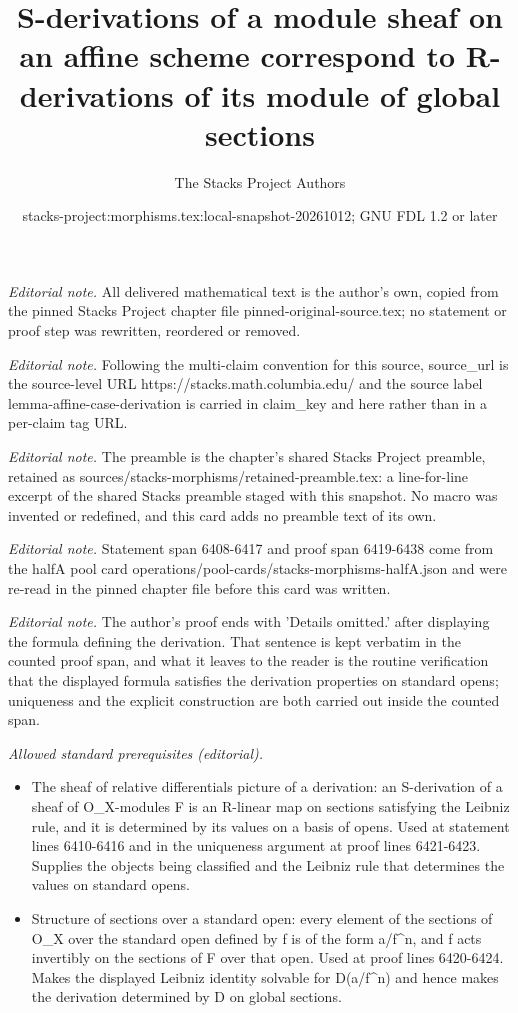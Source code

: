 \documentclass[10pt,a4paper]{amsart}
\title{S-derivations of a module sheaf on an affine scheme correspond to R-derivations of its module of global sections}
\author{The Stacks Project Authors}
\date{stacks-project:morphisms.tex:local-snapshot-20261012; GNU FDL 1.2 or later}
\theoremstyle{plain}
\theoremstyle{definition}
\theoremstyle{remark}
\numberwithin{equation}{subsection}
\begin{document}
\maketitle
\noindent\textit{Editorial note.} All delivered mathematical text is the author's own, copied from the pinned Stacks Project chapter file pinned-original-source.tex; no statement or proof step was rewritten, reordered or removed.\par\medskip
\noindent\textit{Editorial note.} Following the multi-claim convention for this source, source\_url is the source-level URL https://stacks.math.columbia.edu/ and the source label lemma-affine-case-derivation is carried in claim\_key and here rather than in a per-claim tag URL.\par\medskip
\noindent\textit{Editorial note.} The preamble is the chapter's shared Stacks Project preamble, retained as sources/stacks-morphisms/retained-preamble.tex: a line-for-line excerpt of the shared Stacks preamble staged with this snapshot. No macro was invented or redefined, and this card adds no preamble text of its own.\par\medskip
\noindent\textit{Editorial note.} Statement span 6408-6417 and proof span 6419-6438 come from the halfA pool card operations/pool-cards/stacks-morphisms-halfA.json and were re-read in the pinned chapter file before this card was written.\par\medskip
\noindent\textit{Editorial note.} The author's proof ends with 'Details omitted.' after displaying the formula defining the derivation. That sentence is kept verbatim in the counted proof span, and what it leaves to the reader is the routine verification that the displayed formula satisfies the derivation properties on standard opens; uniqueness and the explicit construction are both carried out inside the counted span.\par\medskip
\noindent\textit{Allowed standard prerequisites (editorial).}\begin{itemize}
\item The sheaf of relative differentials picture of a derivation: an S-derivation of a sheaf of O\_X-modules F is an R-linear map on sections satisfying the Leibniz rule, and it is determined by its values on a basis of opens. Used at statement lines 6410-6416 and in the uniqueness argument at proof lines 6421-6423. Supplies the objects being classified and the Leibniz rule that determines the values on standard opens.
\item Structure of sections over a standard open: every element of the sections of O\_X over the standard open defined by f is of the form a/f\textasciicircum{}n, and f acts invertibly on the sections of F over that open. Used at proof lines 6420-6424. Makes the displayed Leibniz identity solvable for D(a/f\textasciicircum{}n) and hence makes the derivation determined by D on global sections.
\end{itemize}\medskip
\end{document}

